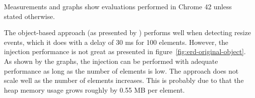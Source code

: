 \documentclass{acm_proc_article-sp}
\begin{document}
    Measurements and graphs show evaluations performed in Chrome 42 unless stated otherwise.


    

    The object-based approach (as presented by \cite{backalley}) performs well when detecting resize events, which it does with a delay of 30 ms for 100 elements.
    However, the injection performance is not great as presented in figure~\ref{fig:erd-original-object}.
    As shown by the graphs, the injection can be performed with adequate performance as long as the number of elements is low.
    The approach does not scale well as the number of elements increases.
    This is probably due to that the heap memory usage grows roughly by 0.55 MB per element.
\end{document}
